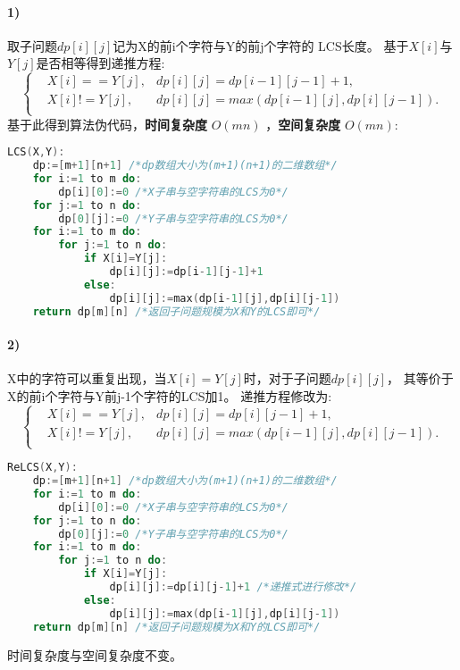 \documentclass[11pt,a4paper,oneside,oldfontcommands]{ctexart}
\begin{document}
\paragraph*{1)}取子问题$dp[i][j]$记为X的前i个字符与Y的前j个字符的
LCS长度。
基于$X[i]$与$Y[j]$是否相等得到递推方程:
$$\left\{
	\begin{aligned}
		&X[i]==Y[j],&dp[i][j]=dp[i-1][j-1]+1,\\
		&X[i]!=Y[j],&dp[i][j]=max(dp[i-1][j],dp[i][j-1]).\\
	\end{aligned}
\right.
$$
基于此得到算法伪代码，\textbf{时间复杂度} $O(mn)$
，\textbf{空间复杂度} $O(mn)$:
\begin{lstlisting}[language=C++,title=LCS.func]
LCS(X,Y):
	dp:=[m+1][n+1] /*dp数组大小为(m+1)(n+1)的二维数组*/
	for i:=1 to m do:
		dp[i][0]:=0 /*X子串与空字符串的LCS为0*/
	for j:=1 to n do:
		dp[0][j]:=0 /*Y子串与空字符串的LCS为0*/
	for i:=1 to m do:
		for j:=1 to n do:
			if X[i]=Y[j]:
				dp[i][j]:=dp[i-1][j-1]+1
			else:
				dp[i][j]:=max(dp[i-1][j],dp[i][j-1])
	return dp[m][n] /*返回子问题规模为X和Y的LCS即可*/
\end{lstlisting}
\paragraph*{2)}
X中的字符可以重复出现，当$X[i]=Y[j]$时，对于子问题$dp[i][j]$，
其等价于X的前i个字符与Y前j-1个字符的LCS加1。
递推方程修改为:
$$\left\{
	\begin{aligned}
		&X[i]==Y[j],&dp[i][j]=dp[i][j-1]+1,\\
		&X[i]!=Y[j],&dp[i][j]=max(dp[i-1][j],dp[i][j-1]).\\
	\end{aligned}
\right.
$$
\begin{lstlisting}[language=C++,title=ReLCS.func]
ReLCS(X,Y):
	dp:=[m+1][n+1] /*dp数组大小为(m+1)(n+1)的二维数组*/
	for i:=1 to m do:
		dp[i][0]:=0 /*X子串与空字符串的LCS为0*/
	for j:=1 to n do:
		dp[0][j]:=0 /*Y子串与空字符串的LCS为0*/
	for i:=1 to m do:
		for j:=1 to n do:
			if X[i]=Y[j]:
				dp[i][j]:=dp[i][j-1]+1 /*递推式进行修改*/
			else:
				dp[i][j]:=max(dp[i-1][j],dp[i][j-1])
	return dp[m][n] /*返回子问题规模为X和Y的LCS即可*/
\end{lstlisting}
时间复杂度与空间复杂度不变。
\end{document}
